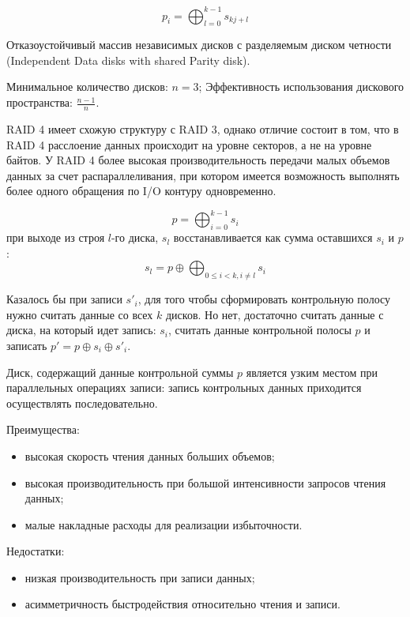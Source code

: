 \[p_{i}=\bigoplus_{l=0}^{k-1}s_{kj+l}\]

Отказоустойчивый массив независимых дисков с разделяемым диском четности (Independent Data disks with shared Parity disk).

Минимальное количество дисков: $n=3$; Эффективность использования дискового пространства: $\frac{n-1}{n}$.

RAID 4 имеет схожую структуру с RAID 3, однако отличие состоит в том, что в RAID 4 расслоение данных происходит на уровне секторов, а не на уровне байтов. У RAID 4 более высокая производительность передачи малых объемов данных за счет распараллеливания, при котором имеется возможность выполнять более одного обращения по I/O контуру одновременно.

\[p=\bigoplus_{i=0}^{k-1}s_i\] при выходе из строя $l$-го диска, $s_l$ восстанавливается как сумма оставшихся $s_i$ и $p$:
\[s_l=p\oplus \bigoplus_{0\leq i<k,i\neq l}s_i\]

Казалось бы при записи $s'_i$, для того чтобы сформировать контрольную полосу нужно считать данные со всех $k$ дисков. Но нет, достаточно считать данные с диска, на который идет запись: $s_i$, считать данные контрольной полосы $p$ и записать $p'=p\oplus s_i \oplus s'_i$.

Диск, содержащий данные контрольной суммы $p$ является узким местом при параллельных операциях записи: запись контрольных данных приходится осуществлять последовательно.

Преимущества:
\begin{itemize}
    \item высокая скорость чтения данных больших объемов;
    \item высокая производительность при большой интенсивности запросов чтения данных;
    \item малые накладные расходы для реализации избыточности. 
\end{itemize}

Недостатки:
\begin{itemize}
    \item низкая производительность при записи данных;
    \item асимметричность быстродействия относительно чтения и записи.
\end{itemize}


